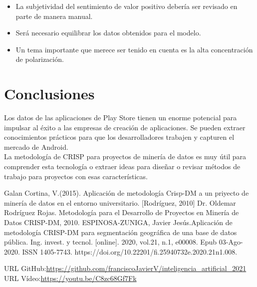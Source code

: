 \documentclass[conference]{IEEEtran}
\begin{document}
\begin{itemize}
\item La subjetividad del sentimiento de valor positivo debería ser revisado en parte de manera manual.
\item Será necesario equilibrar los datos obtenidos para el modelo.
\item Un tema importante que merece ser tenido en cuenta es la alta concentración de polarización.

\end{itemize}

\section{Conclusiones}
Los datos de las aplicaciones de Play Store tienen un enorme potencial para impulsar al éxito a las empresas de creación de aplicaciones. Se pueden extraer conocimientos prácticos para que los desarrolladores trabajen y capturen el mercado de Android.\\

La metodología de CRISP para proyectos de minería de datos es muy útil para comprender esta tecnología o extraer ideas para diseñar o revisar métodos de trabajo para proyectos con esas características.

\begin{thebibliography}{00}
 Galan Cortina, V.(2015). Aplicación de metodología Crisp-DM a un priyecto de minería de datos en el entorno universitario.
 [Rodríguez, 2010] Dr. Oldemar Rodríguez Rojas. Metodología para el Desarrollo de Proyectos en Minería de Datos CRISP-DM, 2010.
 ESPINOSA-ZUNIGA, Javier Jesús.Aplicación de metodología CRISP-DM para segmentación geográfica de una base de datos pública. Ing. invest. y tecnol. [online]. 2020, vol.21, n.1, e00008.  Epub 03-Ago-2020. ISSN 1405-7743.  https://doi.org/10.22201/fi.25940732e.2020.21n1.008.

\end{thebibliography}

\vspace{12pt}
\color{red} 
URL GitHub:\url{https://github.com/franciscoJavierV/inteligencia_artificial_2021}\\
URL Vídeo:\url{https://youtu.be/C8zc68Gf7Fk}
\end{document}
